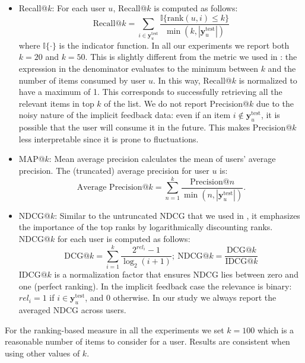\begin{itemize}
\item Recall@$k$: For each user $u$, Recall@$k$ is computed as follows:
\begin{displaymath}
\text{Recall@}k =\sum_{i\in\mathbf{y}^{\text{test}}_u} \frac{\mathbb{I}\{\text{rank}(u, i) \leq k\}}{\min(k, |\mathbf{y}_u^{\text{test}}|) }
\end{displaymath}
where $\mathbb{I}\{\cdot\}$ is the indicator function. In all our experiments we report both $k=20$ and $k=50$. This is slightly different from the metric we used in : the expression in the denominator evaluates to the minimum between $k$ and the
number of items consumed by user $u$. In this way, Recall@$k$ is normalized to have a maximum of 1. This corresponds to successfully retrieving all the relevant items in top $k$ of the list. We do not report Precision@$k$ due to the noisy nature of the implicit feedback data: even if an item $i\notin \mathbf{y}_u^{\text{test}}$, it is possible that the user will consume it in the future. This makes Precision@$k$ less interpretable since it is prone to fluctuations. 
\item MAP@$k$: Mean average precision calculates the mean of users' average precision. The (truncated) average precision for user $u$ is: 
\begin{displaymath}
  \text{Average Precision}@k = \sum_{n=1}^k \frac{\text{Precision}@n}{\min(n,|\mathbf{y}_u^{\text{test}}|)}.
\end{displaymath}
\item NDCG@$k$: Similar to the untruncated NDCG that we used in , it emphasizes the importance of the top ranks by logarithmically discounting ranks. NDCG@$k$ for each user is computed as follows:
\begin{displaymath}
\text{DCG}@k = \sum_{i=1}^k \frac{2^{rel_i} - 1}{\log_2(i + 1)}; ~ \text{NDCG}@k = \frac{\text{DCG}@k}{\text{IDCG}@k}
\end{displaymath}
IDCG$@k$ is a normalization factor that ensures NDCG lies between zero and one
(perfect ranking). In the implicit feedback case the relevance is binary:
$rel_i = 1$ if $i\in \mathbf{y}_u^{\text{test}}$, and 0 otherwise. In our
study we always report the averaged NDCG across users. 
\end{itemize}

For the ranking-based measure in all the experiments we set $k=100$ which
is a reasonable number of items to consider for a user. Results are
consistent when using other values of $k$. 
 

